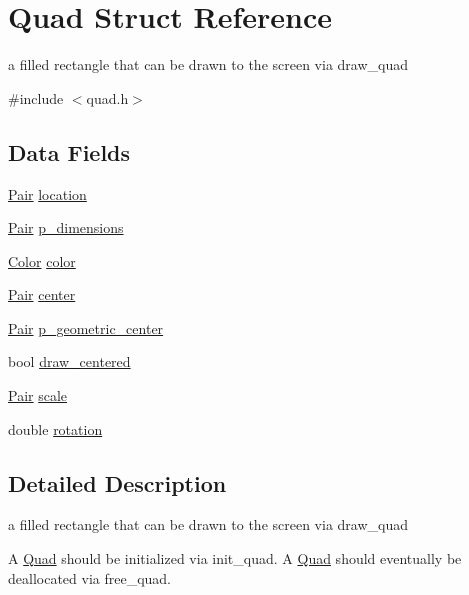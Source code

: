 \hypertarget{struct_quad}{\section{Quad Struct Reference}
\label{struct_quad}
}


a filled rectangle that can be drawn to the screen via draw\-\_\-quad  




{\ttfamily \#include $<$quad.\-h$>$}

\subsection*{Data Fields}
\begin{DoxyCompactItemize}
\item 
\hyperlink{struct_pair}{Pair} \hyperlink{struct_quad_a8be8d65aebce0eef50924f79388d2cb1}{location}
\item 
\hyperlink{struct_pair}{Pair} \hyperlink{struct_quad_a0783c0afcc8da455608372d89c46a038}{p\-\_\-dimensions}
\item 
\hyperlink{struct_color}{Color} \hyperlink{struct_quad_aba4cc1411529b22237d51ed7338d7db3}{color}
\item 
\hyperlink{struct_pair}{Pair} \hyperlink{struct_quad_ad41dad5ce3589e5e0a707c306f864c75}{center}
\item 
\hyperlink{struct_pair}{Pair} \hyperlink{struct_quad_a7920053596641e39e67eb5c54fc2e8c2}{p\-\_\-geometric\-\_\-center}
\item 
bool \hyperlink{struct_quad_a22358ac9a070eb4aa4045ae5f6c98ebf}{draw\-\_\-centered}
\item 
\hyperlink{struct_pair}{Pair} \hyperlink{struct_quad_adad2b89c97a458d7d99b76e813bf2a99}{scale}
\item 
double \hyperlink{struct_quad_aca4a565629031a148e2ae8f92944f59b}{rotation}
\end{DoxyCompactItemize}


\subsection{Detailed Description}
a filled rectangle that can be drawn to the screen via draw\-\_\-quad 

A \hyperlink{struct_quad}{Quad} should be initialized via init\-\_\-quad. A \hyperlink{struct_quad}{Quad} should eventually be deallocated via free\-\_\-quad. 


